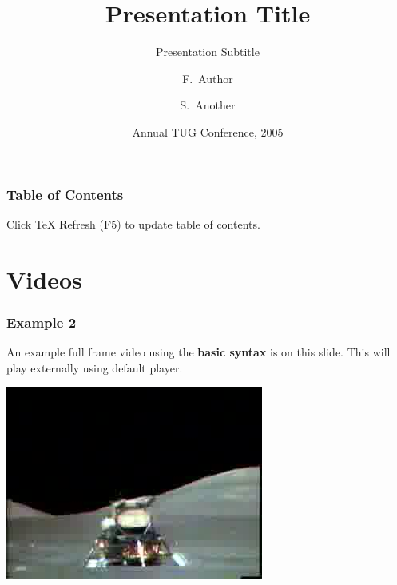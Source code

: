\documentclass{beamer}
\begin{document}

\title{Presentation Title}
\subtitle{Presentation Subtitle}

\author{F.~Author \and S.~Another}

\date[TUG 2005]{Annual TUG Conference, 2005}

\subject{Desktop Publishing} %

\begin{frame}
  \titlepage
\end{frame}

\begin{frame}
  \frametitle{Table of Contents}
  \tableofcontents
  Click TeX Refresh (F5) to update table of contents.
\end{frame}

\section{Videos}

\begin{frame}
    \frametitle{Example 2}
    
    An example full frame video using the \textbf{basic syntax} is on this slide. This will play externally using default player.
    
    \vspace{20pt}
    
    \href{run:apollo17.avi}{\includegraphics[height=0.7\textheight]{outputFrame_16.jpeg}}
\end{frame}
\end{document}
